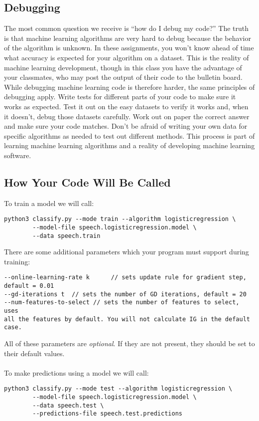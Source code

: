\documentclass[11pt]{article}
\begin{document}
	\subsection{Debugging}
	The most common question we receive is ``how do I debug my code?'' The truth is that machine learning algorithms are very hard to debug because
	the behavior of the algorithm is unknown. In these assignments, you won't know ahead of time what accuracy is expected for your algorithm on a dataset.
	This is the reality of machine learning development, though in this class you have the advantage of your classmates, who may post the output of their code to the
	bulletin board. While debugging machine learning code is therefore harder, the same principles of debugging apply. Write tests for different parts of your code
	to make sure it works as expected. Test it out on the easy datasets to verify it works and, when it doesn't, debug those datasets carefully. Work out on paper
	the correct answer and make sure your code matches. Don't be afraid of writing your own data for specific algorithms as needed to test out different methods.
	This process is part of learning machine learning algorithms and a reality of developing machine learning software.


\subsection{How Your Code Will Be Called}

To train a model we will call:
\begin{verbatim}
python3 classify.py --mode train --algorithm logisticregression \
        --model-file speech.logisticregression.model \
        --data speech.train
\end{verbatim}

There are some additional parameters which your program must support during training:
\begin{verbatim}
--online-learning-rate k	  // sets update rule for gradient step, default = 0.01
--gd-iterations t  // sets the number of GD iterations, default = 20
--num-features-to-select // sets the number of features to select, uses 
all the features by default. You will not calculate IG in the default case.
\end{verbatim}

All of these parameters are \emph{optional}. If they are not present, they should be set to their default values.\\
\\
To make predictions using a model we will call:
\begin{verbatim}
python3 classify.py --mode test --algorithm logisticregression \
        --model-file speech.logisticregression.model \
        --data speech.test \
        --predictions-file speech.test.predictions
\end{verbatim}
\end{document}
